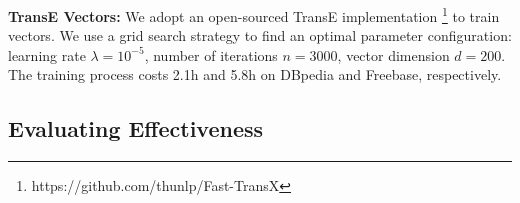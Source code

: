 \noindent\textbf{TransE Vectors:}
%
We adopt an open-sourced TransE implementation
\footnote{https://github.com/thunlp/Fast-TransX} to train vectors.
We use a grid search strategy to find an optimal parameter configuration: learning rate $\lambda=10^{-5}$, number of iterations $n=3000$, vector dimension $d=200$. The training process costs 2.1h and 5.8h on DBpedia and Freebase, respectively.

\vspace{-0.1in}
\subsection{Evaluating Effectiveness}

